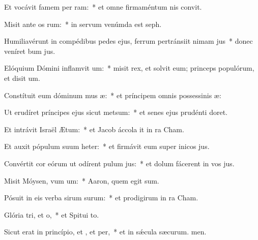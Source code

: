 \item Et vocávit famem per ram:~* et omne firmaméntum nis convit.
\item Misit ante os rum:~* in servum venúmda est seph.
\item Humiliavérunt in compédibus pedes ejus, ferrum pertránsiit nimam jus~* donec veníret bum jus.
\item Elóquium Dómini inflamvit um:~* misit rex, et solvit eum; princeps populórum, et disit um.
\item Constítuit eum dóminum mus æ:~* et príncipem omnis possessinis æ:
\item Ut erudíret príncipes ejus sicut metsum:~* et senes ejus prudénti doret.
\item Et intrávit Israël  Ætum:~* et Jacob áccola it in ra Cham.
\item Et auxit pópulum suum heter:~* et firmávit eum super inicos jus.
\item Convértit cor eórum ut odírent pulum jus:~* et dolum fácerent in vos jus.
\item Misit Móysen, vum um:~* Aaron, quem egit sum.
\item Pósuit in eis verba sirum surum:~* et prodigirum in ra Cham.
\item Glória tri, et o,~* et Spitui to.
\item Sicut erat in princípio, et , et per,~* et in sǽcula sæcurum. men.
